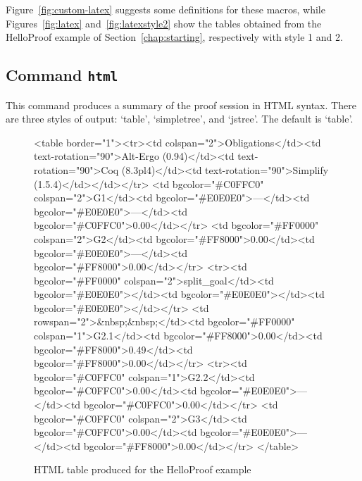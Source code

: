 Figure~\ref{fig:custom-latex} suggests some definitions for these
macros, while Figures~\ref{fig:latex} and~\ref{fig:latexstyle2} show
the tables obtained from the HelloProof example of
Section~\ref{chap:starting}, respectively with style 1 and 2.

\subsection{Command \texttt{html}}

This command produces a summary of the proof session in HTML syntax.
There are three styles of output: `table', `simpletree', and
`jstree'. The default is `table'.

\begin{figure}[t]
\begin{center}
\begin{htmlonly}
\begin{rawhtml}
<table border="1"><tr><td colspan="2">Obligations</td><td text-rotation="90">Alt-Ergo (0.94)</td><td text-rotation="90">Coq (8.3pl4)</td><td text-rotation="90">Simplify (1.5.4)</td></td></tr>
<td bgcolor="#C0FFC0" colspan="2">G1</td><td bgcolor="#E0E0E0">---</td><td bgcolor="#E0E0E0">---</td><td bgcolor="#C0FFC0">0.00</td></tr>
<td bgcolor="#FF0000" colspan="2">G2</td><td bgcolor="#FF8000">0.00</td><td bgcolor="#E0E0E0">---</td><td bgcolor="#FF8000">0.00</td></tr>
<tr><td bgcolor="#FF0000" colspan="2">split_goal</td><td bgcolor="#E0E0E0"></td><td bgcolor="#E0E0E0"></td><td bgcolor="#E0E0E0"></td></tr>
<td rowspan="2">&nbsp;&nbsp;</td><td bgcolor="#FF0000" colspan="1">G2.1</td><td bgcolor="#FF8000">0.00</td><td bgcolor="#FF8000">0.49</td><td bgcolor="#FF8000">0.00</td></tr>
<tr><td bgcolor="#C0FFC0" colspan="1">G2.2</td><td bgcolor="#C0FFC0">0.00</td><td bgcolor="#E0E0E0">---</td><td bgcolor="#C0FFC0">0.00</td></tr>
<td bgcolor="#C0FFC0" colspan="2">G3</td><td bgcolor="#C0FFC0">0.00</td><td bgcolor="#E0E0E0">---</td><td bgcolor="#FF8000">0.00</td></tr>
</table>
\end{rawhtml}
\end{htmlonly}
\end{center}
\caption{HTML table produced for the HelloProof example}
\label{fig:html}
\end{figure}

